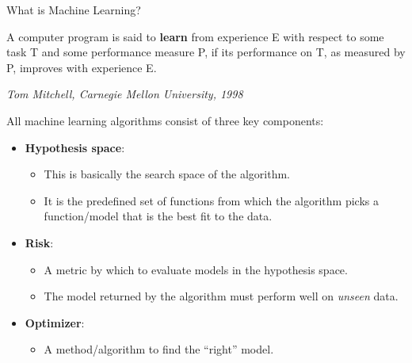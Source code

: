 \begin{vbframe}{What is Machine Learning? }

\vspace{2cm}

\begin{center}
  \fontsize{13pt}{13pt}\selectfont
  A computer program is said to \textbf{learn} from experience E with respect to some task T and some performance measure P, if its performance on T, as measured by P, improves with experience E. \\
  \begin{footnotesize}
  \emph{Tom Mitchell, Carnegie Mellon University, 1998}
  \end{footnotesize}
\end{center}

\framebreak 

All machine learning algorithms consist of three key components:
  \begin{itemize}
    \item \textbf{Hypothesis space}:
    \begin{itemize}
      \item This is basically the search space of the algorithm. 
      \item It is the predefined set of functions from which the algorithm picks a function/model that is the best fit to the data.
    \end{itemize}
    \vspace{4mm}
    \item \textbf{Risk}:
    \begin{itemize}
      \item A metric by which to evaluate models in the hypothesis space.
      \item The model returned by the algorithm must perform well on \textit{unseen} data.
    \end{itemize}
    \vspace{4mm}
    \item \textbf{Optimizer}:
      \begin{itemize}
        \item A method/algorithm to find the \enquote{right} model.
      \end{itemize}
  \end{itemize}

\end{vbframe}

